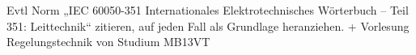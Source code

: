 


Evtl Norm „IEC 60050-351 Internationales Elektrotechnisches Wörterbuch – Teil 351: Leittechnik“ zitieren, auf jeden Fall als Grundlage heranziehen.
+ Vorlesung Regelungstechnik von Studium MB13VT


































